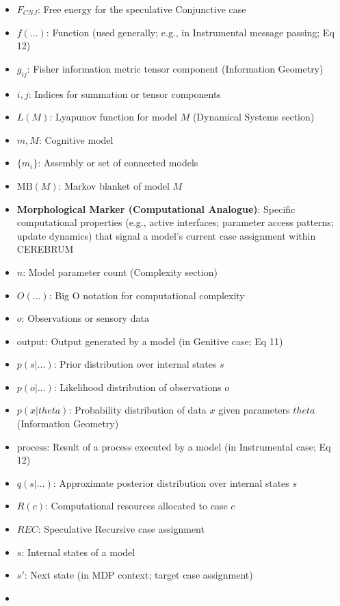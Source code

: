 \documentclass[
]{book}
\begin{document}
\begin{itemize}
\item
  \(F_{CNJ}\): Free energy for the speculative Conjunctive case
\item
  \(f(...)\): Function (used generally; e.g., in Instrumental message
  passing; Eq 12)
\item
  \(g_{ij}\): Fisher information metric tensor component (Information
  Geometry)
\item
  \(i, j\): Indices for summation or tensor components
\item
  \(L(M)\): Lyapunov function for model \(M\) (Dynamical Systems
  section)
\item
  \(m, M\): Cognitive model
\item
  \(\{m_i\}\): Assembly or set of connected models
\item
  \(\text{MB}(M)\): Markov blanket of model \(M\)
\item
  \textbf{Morphological Marker (Computational Analogue)}: Specific
  computational properties (e.g., active interfaces; parameter access
  patterns; update dynamics) that signal a model's current case
  assignment within CEREBRUM
\item
  \(n\): Model parameter count (Complexity section)
\item
  \(O(...)\): Big O notation for computational complexity
\item
  \(o\): Observations or sensory data
\item
  \(\text{output}\): Output generated by a model (in Genitive case; Eq
  11)
\item
  \(p(s|...)\): Prior distribution over internal states \(s\)
\item
  \(p(o|...)\): Likelihood distribution of observations \(o\)
\item
  \(p(x|theta)\): Probability distribution of data \(x\) given
  parameters \(theta\) (Information Geometry)
\item
  \(\text{process}\): Result of a process executed by a model (in
  Instrumental case; Eq 12)
\item
  \(q(s|...)\): Approximate posterior distribution over internal states
  \(s\)
\item
  \(R(c)\): Computational resources allocated to case \(c\)
\item
  \(REC\): Speculative Recursive case assignment
\item
  \(s\): Internal states of a model
\item
  \(s'\): Next state (in MDP context; target case assignment)
\item

\end{itemize}
\end{document}

